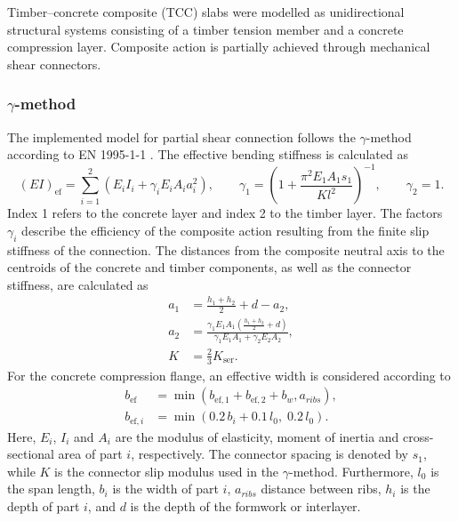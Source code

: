 Timber--concrete composite (TCC) slabs were modelled as unidirectional structural systems consisting of a timber tension member and a concrete compression layer. Composite action is partially achieved through mechanical shear connectors. 

\subsubsection{$\gamma$-method}

The implemented model for partial shear connection follows the $\gamma$-method according to EN 1995-1-1 \cite{Eurocode5_2023}. The effective bending stiffness is calculated as
\begin{equation}
(EI)_{\mathrm{ef}}
=
\sum_{i=1}^{2}
\left(
E_i I_i
+
\gamma_i E_i A_i a_i^2
\right),
\qquad
\gamma_1
=
\left(
1+
\frac{\pi^2 E_1 A_1 s_1}{K l^2}
\right)^{-1},
\qquad
\gamma_2 = 1.
\end{equation}
Index 1 refers to the concrete layer and index 2 to the timber layer. The factors $\gamma_i$ describe the efficiency of the composite action resulting from the finite slip stiffness of the connection. The distances from the composite neutral axis to the centroids of the concrete and timber components, as well as the connector stiffness, are calculated as
\begin{equation}
\begin{aligned}
a_1
&=
\frac{h_1+h_2}{2}
+d
-a_2,
\\
a_2
&=
\frac{
\gamma_1 E_1 A_1
\left(
\frac{h_1+h_2}{2}
+
d
\right)
}
{
\gamma_1 E_1 A_1
+
\gamma_2 E_2 A_2
},
\\
K
&=
\frac{2}{3}K_{\mathrm{ser}}.
\end{aligned}
\end{equation}
For the concrete compression flange, an effective width is considered according to
\begin{equation}
\begin{aligned}
b_{\mathrm{ef}}
&=
\min
\left(b_{\mathrm{ef},1}
+
b_{\mathrm{ef},2}
+
b_w, a_{ribs}\right),
\\
b_{\mathrm{ef},i}
&=
\min
\left(
0.2\,b_i
+
0.1\,l_0,
\;
0.2\,l_0
\right).
\end{aligned}
\end{equation}
Here, $E_i$, $I_i$ and $A_i$ are the modulus of elasticity, moment of inertia and cross-sectional area of part $i$, respectively. The connector spacing is denoted by $s_1$, while $K$ is the connector slip modulus used in the $\gamma$-method. Furthermore, $l_0$ is the span length, $b_i$ is the width of part $i$, $a_{ribs}$ distance between ribs, $h_i$ is the depth of part $i$, and $d$ is the depth of the formwork or interlayer.

